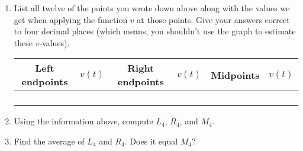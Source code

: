 \documentclass[11pt]{article}
\begin{document}
\begin{enumerate}
	\item List all twelve of the points you wrote down above along with the values we get when applying the function $v$ at those points. Give your answers correct to four decimal places (which means, you shouldn't use the graph to estimate these $v$-values). 
	\begin{center}
		\begin{tabular}{c|c||c|c||c|c}
		Left endpoints & $v(t)$ & Right endpoints & $v(t)$ & Midpoints & $v(t)$ \\ \hline \hline
		\hspace{0.3in} & \hspace{1in} &  \hspace{0.3in} &  \hspace{1in} &  \hspace{0.3in} &  \hspace{1in}  \\ \hline
			\hspace{0.3in} & \hspace{0.3in} &  \hspace{0.3in} &  \hspace{0.3in} &  \hspace{0.3in} &  \hspace{0.3in}   \\ \hline
				\hspace{0.3in} & \hspace{0.3in} &  \hspace{0.3in} &  \hspace{0.3in} &  \hspace{0.3in} &  \hspace{0.3in}   \\ \hline
					\hspace{0.3in} & \hspace{0.3in} &  \hspace{0.3in} &  \hspace{0.3in} &  \hspace{0.3in} &  \hspace{0.3in} 
		\end{tabular}
	\end{center}
	
	
	\item Using the information above, compute $L_4$, $R_4$, and $M_4$. 
	
	\vspace{2in}
	
	
	\item Find the average of $L_4$ and $R_4$. Does it equal $M_4$? 
	

\end{enumerate}
\end{document}
